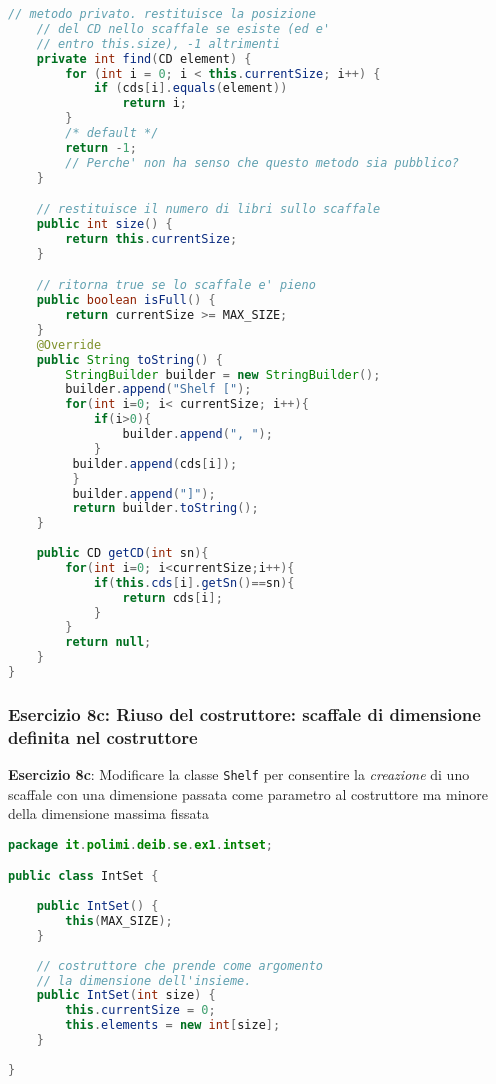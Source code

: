 \documentclass{article}
\begin{document}
\begin{lstlisting}[language=Java,escapechar=|]
	// metodo privato. restituisce la posizione
	// del CD nello scaffale se esiste (ed e'
	// entro this.size), -1 altrimenti
	private int find(CD element) {
		for (int i = 0; i < this.currentSize; i++) {
			if (cds[i].equals(element))
				return i;
		}
		/* default */
		return -1;
		// Perche' non ha senso che questo metodo sia pubblico?
	}

	// restituisce il numero di libri sullo scaffale
	public int size() {
		return this.currentSize;
	}

	// ritorna true se lo scaffale e' pieno
	public boolean isFull() {
		return currentSize >= MAX_SIZE;
	}
	@Override
	public String toString() {
		StringBuilder builder = new StringBuilder();
        builder.append("Shelf [");
        for(int i=0; i< currentSize; i++){
            if(i>0){
                builder.append(", ");
            }
         builder.append(cds[i]);
         }
         builder.append("]");
         return builder.toString();
	}
	
	public CD getCD(int sn){
		for(int i=0; i<currentSize;i++){
			if(this.cds[i].getSn()==sn){
				return cds[i];
			}
		}
		return null;
	}
}
\end{lstlisting}

\subsubsection{Esercizio 8c: Riuso del costruttore: scaffale di dimensione definita nel costruttore}
\begin{framed}
\textbf{Esercizio  8c}: Modificare la classe \texttt{Shelf} per consentire la \emph{creazione} di uno scaffale con una dimensione passata come parametro al costruttore ma minore della dimensione massima fissata
\end{framed}


\begin{lstlisting}[language=Java,escapechar=|]
package it.polimi.deib.se.ex1.intset;

public class IntSet {
	
	public IntSet() {
		this(MAX_SIZE);
	}
	
	// costruttore che prende come argomento
	// la dimensione dell'insieme.
	public IntSet(int size) {
		this.currentSize = 0;
		this.elements = new int[size];
	}
	
}
\end{lstlisting}
\end{document}
